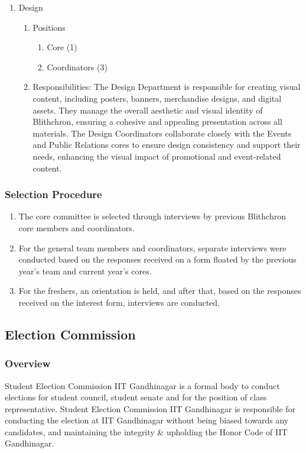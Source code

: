\documentclass[12pt]{article}
\begin{document}
\begin{enumerate}
\begin{enumerate}
    \end{enumerate}
    \item Design
    \begin{enumerate}
        \item Positions
        \begin{enumerate}
            \item Core (1)
            \item Coordinators (3)
        \end{enumerate}
        \item Responsibilities: The Design Department is responsible for creating visual content, including posters, banners, merchandise designs, and digital assets. They manage the overall aesthetic and visual identity of Blithchron, ensuring a cohesive and appealing presentation across all materials. The Design Coordinators collaborate closely with the Events and Public Relations cores to ensure design consistency and support their needs, enhancing the visual impact of promotional and event-related content.
    \end{enumerate}
\end{enumerate}

\subsubsection{Selection Procedure}
\begin{enumerate}
    \item The core committee is selected through interviews by previous Blithchron core members and coordinators.
    \item For the general team members and coordinators, separate interviews were conducted based on the responses received on a form floated by the previous year’s team and current year’s cores.
    \item For the freshers, an orientation is held, and after that, based on the responses received on the interest form, interviews are conducted.
\end{enumerate}


\subsection{Election Commission}
\subsubsection{Overview}
Student Election Commission IIT Gandhinagar is a formal body to conduct elections for student council, student senate and for the position of class representative. Student Election Commission IIT Gandhinagar is responsible for conducting the election at IIT Gandhinagar without being biased towards any candidates, and maintaining the integrity \& upholding the Honor Code of IIT Gandhinagar.\\
\end{document}
